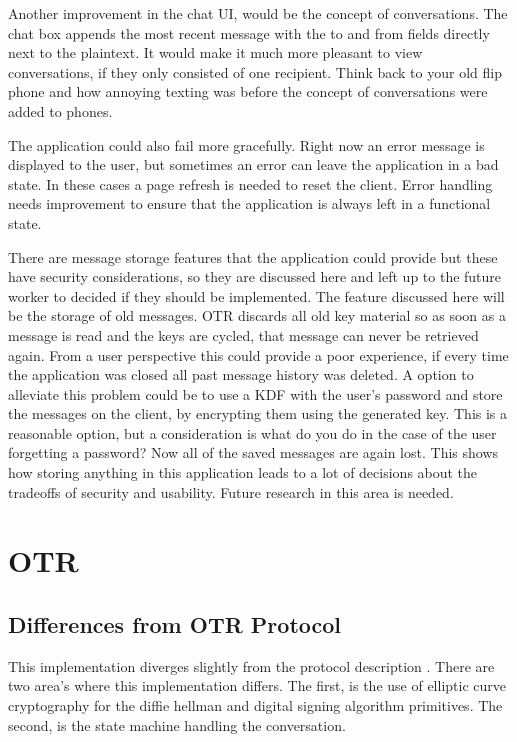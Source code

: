 Another improvement in the chat UI, would be the concept of conversations. The chat box appends the most recent message with the to and from fields directly next to the plaintext. It would make it much more pleasant to view conversations, if they only consisted of one recipient. Think back to your old flip phone and how annoying texting was before the concept of conversations were added to phones.


The application could also fail more gracefully. Right now an error message is displayed to the user, but sometimes an error can leave the application in a bad state. In these cases a page refresh is needed to reset the client. Error handling needs improvement to ensure that the application is always left in a functional state.


There are message storage features that the application could provide but these have security considerations, so they are discussed here and left up to the future worker to decided if they should be implemented. The feature discussed here will be the storage of old messages. OTR discards all old key material so as soon as a message is read and the keys are cycled, that message can never be retrieved again. From a user perspective this could provide a poor experience, if every time the application was closed all past message history was deleted. A option to alleviate this problem could be to use a KDF with the user's password and store the messages on the client, by encrypting them using the generated key. This is a reasonable option, but a consideration is what do you do in the case of the user forgetting a password? Now all of the saved messages are again lost. This shows how storing anything in this application leads to a lot of decisions about the tradeoffs of security and usability. Future research in this area is needed.


\section{OTR}


\subsection{Differences from OTR Protocol}


This implementation diverges slightly from the protocol description \cite{otr-protocol}. There are two area's where this implementation differs. The first, is the use of elliptic curve cryptography for the diffie hellman and digital signing algorithm primitives. The second, is the state machine handling the conversation.


